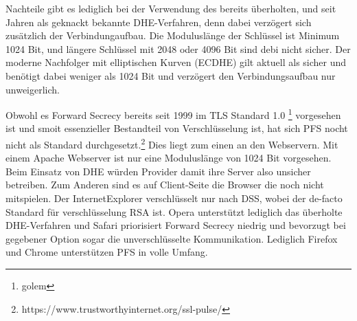 Nachteile gibt es lediglich bei der Verwendung des bereits überholten, und seit Jahren als geknackt bekannte DHE-Verfahren, denn dabei verzögert sich zusätzlich der Verbindungaufbau. Die Moduluslänge der Schlüssel ist Minimum 1024 Bit, und längere Schlüssel mit 2048 oder 4096 Bit sind debi nicht sicher. Der moderne Nachfolger mit elliptischen Kurven (ECDHE) gilt aktuell als sicher und benötigt dabei weniger als 1024 Bit und verzögert den Verbindungsaufbau nur unweigerlich. 

Obwohl es Forward Secrecy bereits seit 1999 im TLS Standard 1.0 \footnote{golem} vorgesehen ist und smoit essenzieller Bestandteil von Verschlüsselung ist, hat sich \ac{PFS} nocht nicht als Standard durchgesetzt.\footnote{https://www.trustworthyinternet.org/ssl-pulse/} Dies liegt zum einen an den Webservern. Mit einem Apache Webserver ist nur eine Moduluslänge von 1024 Bit vorgesehen. Beim Einsatz von DHE würden Provider damit ihre Server also unsicher betreiben. Zum Anderen sind es auf Client-Seite die Browser die noch nicht mitspielen. Der InternetExplorer verschlüsselt nur nach DSS, wobei der de-facto Standard für verschlüsselung RSA ist. Opera unterstützt lediglich das überholte DHE-Verfahren und Safari priorisiert Forward Secrecy niedrig und bevorzugt bei gegebener Option sogar die unverschlüsselte Kommunikation. Lediglich Firefox und Chrome unterstützen \ac{PFS} in volle Umfang. 

